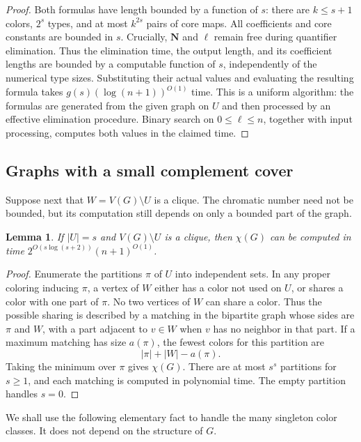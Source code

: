 \documentclass[10pt,a4paper]{amsart}
\numberwithin{equation}{section}
\newtheorem{lemma}[theorem]{Lemma}
\theoremstyle{definition}
\theoremstyle{remark}
\begin{document}
\begin{proof}
Both formulas have length bounded by a function of $s$: there are
$k\leq s+1$ colors, $2^s$ types, and at most $k^{2s}$ pairs of
core maps. All coefficients and core constants are bounded in $s$.
Crucially, $\mathbf N$ and $\ell$ remain free during quantifier
elimination. Thus the elimination time, the output length, and its
coefficient lengths are bounded by a computable function of $s$,
independently of the numerical type sizes.
Substituting their actual values and evaluating the resulting formula
takes $g(s)(\log(n+1))^{O(1)}$ time. This is a uniform algorithm:
the formulas are generated from the given graph on $U$ and then
processed by an effective elimination procedure. Binary search on
$0\leq\ell\leq n$, together with input processing, computes both
values in the claimed time.
\end{proof}

\subsection{Graphs with a small complement cover}

Suppose next that $W=V(G)\setminus U$ is a clique. The chromatic
number need not be bounded, but its computation still depends on
only a bounded part of the graph.

\begin{lemma}\label{rec:chromatic}
If $|U|=s$ and $V(G)\setminus U$ is a clique, then $\chi(G)$ can be
computed in time $2^{O(s\log(s+2))}(n+1)^{O(1)}$.
\end{lemma}
\begin{proof}
Enumerate the partitions $\pi$ of $U$ into independent sets. In any
proper coloring inducing $\pi$, a vertex of $W$ either has a color
not used on $U$, or shares a color with one part of $\pi$.
No two vertices of $W$ can share a color. Thus the possible sharing
is described by a matching in the bipartite graph whose sides are
$\pi$ and $W$, with a part adjacent to $v\in W$ when $v$ has no
neighbor in that part. If a maximum matching has size $a(\pi)$,
the fewest colors for this partition are
\[
|\pi|+|W|-a(\pi).
\]
Taking the minimum over $\pi$ gives $\chi(G)$. There are at most
$s^s$ partitions for $s\geq1$, and each matching is computed in
polynomial time. The empty partition handles $s=0$.
\end{proof}

We shall use the following elementary fact to handle the many
singleton color classes. It does not depend on the structure of $G$.
\end{document}
